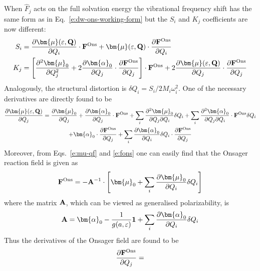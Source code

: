 \documentclass[b5paper,oneside,fleqn,11pt]{book}
\newcommand{\BM}[1]{\bm{#1}}
\newcommand{\fderiv}[2]{\ensuremath{
    \frac{\partial #1}{\partial #2}}}
\newcommand{\sderiv}[2]{\ensuremath{
    \frac{\partial^2 #1}{\partial #2^2}
    }}
\newcommand{\sderivd}[3]{\ensuremath{
    \frac{\partial^2 #1}{\partial #2 \partial #3}
    }}
\begin{document}
\begin{refsection}
When $\hat{F}_j$ acts on the full solvation energy 
the vibrational frequency shift has the same form as 
in Eq.~\eqref{e:dw-ons-working-form}
but the $S_i$ and $K_j$ coefficients are now different:
%
\begin{subequations}
 \begin{align}
  S_i &= \fderiv{{\BM \mu}(\varepsilon,{\bf Q})}{Q_i} \cdot {\bf F}^{\rm Ons}
           + {\BM \mu}(\varepsilon,{\bf Q}) \cdot \fderiv{{\bf F}^{\rm Ons}}{Q_i}
        \label{e:ons-si-iter}  \\
  K_j &= \left[ 
             \sderiv{{\BM \mu}_0}{Q_j}  
        + 2 \fderiv{{\BM \alpha}_0}{Q_j}  \cdot \fderiv{{\bf F}^{\rm Ons}}{Q_j}
         \right] \cdot {\bf F}^{\rm Ons}
         + 2\fderiv{{\BM \mu}(\varepsilon,{\bf Q})}{Q_j} \cdot \fderiv{{\bf F}^{\rm Ons}}{Q_j}
        \label{e:ons-ki-iter}
 \end{align} %
\end{subequations}
%
Analogously, the structural distortion is 
$\delta Q_i=S_i/2M_i\omega_i^2$.
One of the necessary derivatives are directly found to be
%
\begin{multline} \label{e:mu-qf-derivative}
\fderiv{{\BM \mu}(\varepsilon,{\bf Q})}{Q_j} =
\fderiv{{\BM \mu}_0}{Q_j} + \fderiv{{\BM \alpha}_0}{Q_j}  \cdot {\bf F}^{\rm Ons}
+ \sum_i \sderivd{{\BM \mu}_0}{Q_j}{Q_i} \delta Q_i 
+ \sum_i \sderivd{{\BM \alpha}_0}{Q_j}{Q_i} \cdot {\bf F}^{\rm Ons} \delta Q_i \\
+ {\BM \alpha}_0  \cdot \fderiv{{\bf F}^{\rm Ons}}{Q_j} 
+ \sum_i \fderiv{{\BM \alpha}_0}{Q_i} \delta Q_i \cdot \fderiv{{\bf F}^{\rm Ons}}{Q_j} 
\end{multline}
%
Moreover, from Eqs.~\eqref{e:mu-qf}
and \eqref{e:fons} one can easily find that
the Onsager reaction field is given as
%
\begin{equation} \label{e:ons-field}
 {\bf F}^{\rm Ons} = -{\bf A}^{-1} \cdot 
\left[ 
   {\BM \mu}_0 + \sum_i \fderiv{{\BM \mu}_0}{Q_i}\delta Q_i
\right]
\end{equation}
%
where the matrix $\bf A$, which can be viewed as generalised polarizability,
is
%
\begin{equation} \label{e:a-matrix}
{\bf A} = {\BM \alpha}_0 - \frac{1}{g(a,\varepsilon)} {\bf 1}
   + \sum_i \fderiv{{\BM \alpha}_0}{Q_i}\delta Q_i
\end{equation}
%
Thus the derivatives of the Onsager field are found to be
%
\begin{equation} \label{e:ons-field-deriv}
\fderiv{{\bf F}^{\rm Ons}}{Q_j}  = 

\end{equation}
\end{refsection}
\end{document}
